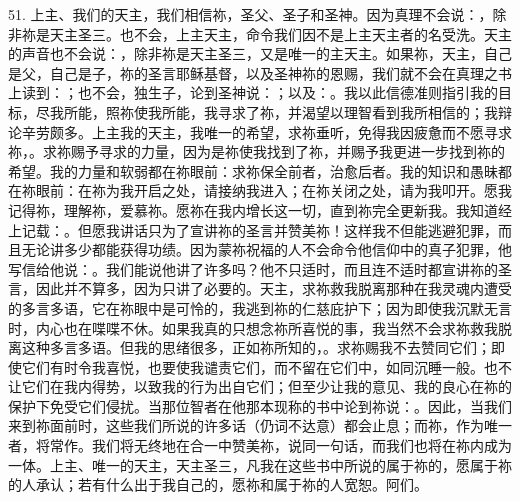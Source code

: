 51. 上主、我们的天主，我们相信祢，圣父、圣子和圣神。因为真理不会说：，除非祢是天主圣三。也不会，上主天主，命令我们因不是上主天主者的名受洗。天主的声音也不会说：，除非祢是天主圣三，又是唯一的主天主。如果祢，天主，自己是父，自己是子，祢的圣言耶稣基督，以及圣神祢的恩赐，我们就不会在真理之书上读到：；也不会，独生子，论到圣神说：；以及：。我以此信德准则指引我的目标，尽我所能，照祢使我所能，我寻求了祢，并渴望以理智看到我所相信的；我辩论辛劳颇多。上主我的天主，我唯一的希望，求祢垂听，免得我因疲惫而不愿寻求祢，。求祢赐予寻求的力量，因为是祢使我找到了祢，并赐予我更进一步找到祢的希望。我的力量和软弱都在祢眼前：求祢保全前者，治愈后者。我的知识和愚昧都在祢眼前：在祢为我开启之处，请接纳我进入；在祢关闭之处，请为我叩开。愿我记得祢，理解祢，爱慕祢。愿祢在我内增长这一切，直到祢完全更新我。我知道经上记载：。但愿我讲话只为了宣讲祢的圣言并赞美祢！这样我不但能逃避犯罪，而且无论讲多少都能获得功绩。因为蒙祢祝福的人不会命令他信仰中的真子犯罪，他写信给他说：。我们能说他讲了许多吗？他不只适时，而且连不适时都宣讲祢的圣言，因此并不算多，因为只讲了必要的。天主，求祢救我脱离那种在我灵魂内遭受的多言多语，它在祢眼中是可怜的，我逃到祢的仁慈庇护下；因为即使我沉默无言时，内心也在喋喋不休。如果我真的只想念祢所喜悦的事，我当然不会求祢救我脱离这种多言多语。但我的思绪很多，正如祢所知的，。求祢赐我不去赞同它们；即使它们有时令我喜悦，也要使我谴责它们，而不留在它们中，如同沉睡一般。也不让它们在我内得势，以致我的行为出自它们；但至少让我的意见、我的良心在祢的保护下免受它们侵扰。当那位智者在他那本现称的书中论到祢说：。因此，当我们来到祢面前时，这些我们所说的许多话（仍词不达意）都会止息；而祢，作为唯一者，将常作。我们将无终地在合一中赞美祢，说同一句话，而我们也将在祢内成为一体。上主、唯一的天主，天主圣三，凡我在这些书中所说的属于祢的，愿属于祢的人承认；若有什么出于我自己的，愿祢和属于祢的人宽恕。阿们。\par

